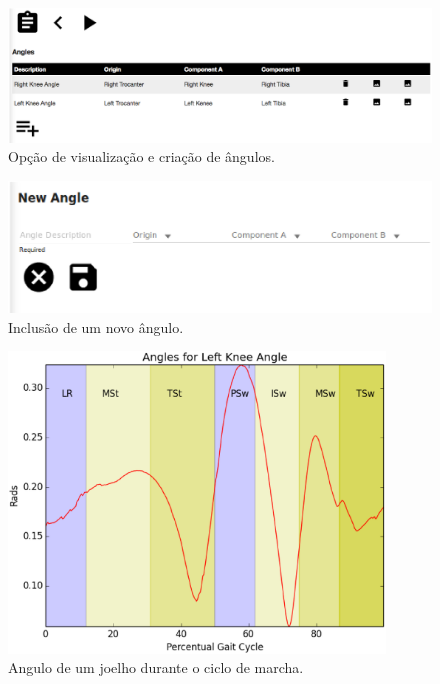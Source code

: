 \begin{figure}[ht]
	\centering
	\includegraphics[width=15cm]{figuras/tela23.eps}
	\caption{Opção de visualização e criação de ângulos.}
\label{tela23}
\end{figure}


\begin{figure}[ht]
	\centering
	\includegraphics[width=15cm]{figuras/tela24.eps}
	\caption{Inclusão de um novo ângulo.}
\label{tela24}
\end{figure}

\begin{figure}[ht]
	\centering
	\includegraphics[width=10cm]{figuras/tela25.eps}
	\caption{Angulo de um joelho durante o ciclo de marcha.}
\label{tela25}
\end{figure}

